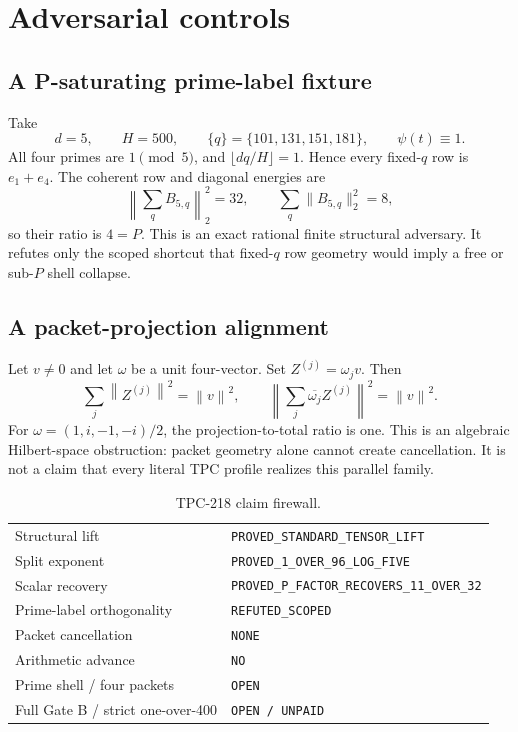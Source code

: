 \documentclass[11pt]{article}
\theoremstyle{remark}
\newcommand{\norm}[1]{\left\lVert #1\right\rVert}
\begin{document}
\section{Adversarial controls}

\subsection{A P-saturating prime-label fixture}

Take
\[
 d=5,\qquad H=500,\qquad
 \{q\}=\{101,131,151,181\},\qquad \psi(t)\equiv1.
\]
All four primes are $1\pmod5$, and $\lfloor dq/H\rfloor=1$.  Hence every
fixed-$q$ row is $e_1+e_4$.  The coherent row and diagonal energies are
\[
 \left\|\sum_qB_{5,q}\right\|_2^2=32,\qquad
 \sum_q\|B_{5,q}\|_2^2=8,
\]
so their ratio is $4=P$.  This is an exact rational finite structural
adversary.  It refutes only the scoped shortcut that fixed-$q$ row geometry
would imply a free or sub-$P$ shell collapse.

\subsection{A packet-projection alignment}

Let $v\neq0$ and let $\omega$ be a unit four-vector.  Set
$Z^{(j)}=\omega_jv$.  Then
\[
 \sum_j\norm{Z^{(j)}}^2=\norm v^2,\qquad
 \left\|\sum_j\overline{\omega_j}Z^{(j)}\right\|^2=\norm v^2.
\]
For $\omega=(1,i,-1,-i)/2$, the projection-to-total ratio is one.  This is an
algebraic Hilbert-space obstruction: packet geometry alone cannot create
cancellation.  It is not a claim that every literal TPC profile realizes this
parallel family.

\begin{table}[t]
\centering
\caption{TPC-218 claim firewall.}
\begin{tabular}{ll}
\toprule
Structural lift & \texttt{PROVED\_STANDARD\_TENSOR\_LIFT}\\
Split exponent & \texttt{PROVED\_1\_OVER\_96\_LOG\_FIVE}\\
Scalar recovery & \texttt{PROVED\_P\_FACTOR\_RECOVERS\_11\_OVER\_32}\\
Prime-label orthogonality & \texttt{REFUTED\_SCOPED}\\
Packet cancellation & \texttt{NONE}\\
Arithmetic advance & \texttt{NO}\\
Prime shell / four packets & \texttt{OPEN}\\
Full Gate B / strict one-over-400 & \texttt{OPEN / UNPAID}\\
\bottomrule
\end{tabular}
\end{table}
\end{document}
